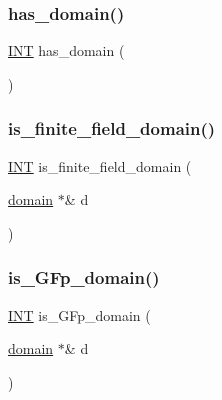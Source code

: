 \mbox{\label{domain_8_c_af7df1c554310c6214b2900bf6ca7ac81}} 
\subsubsection{\texorpdfstring{has\+\_\+domain()}{has\_domain()}}
{\footnotesize\ttfamily \mbox{\hyperlink{galois_8h_a09fddde158a3a20bd2dcadb609de11dc}{I\+NT}} has\+\_\+domain (\begin{DoxyParamCaption}{ }\end{DoxyParamCaption})}

\mbox{\label{domain_8_c_a77d0ace35941cfe84035c9a060972b2a}} 
\subsubsection{\texorpdfstring{is\+\_\+finite\+\_\+field\+\_\+domain()}{is\_finite\_field\_domain()}}
{\footnotesize\ttfamily \mbox{\hyperlink{galois_8h_a09fddde158a3a20bd2dcadb609de11dc}{I\+NT}} is\+\_\+finite\+\_\+field\+\_\+domain (\begin{DoxyParamCaption}\item[{\mbox{\hyperlink{classdomain}{domain}} $\ast$\&}]{d }\end{DoxyParamCaption})}

\mbox{\label{domain_8_c_ab75527270302df466fc6f6e355775c13}} 
\subsubsection{\texorpdfstring{is\+\_\+\+G\+Fp\+\_\+domain()}{is\_GFp\_domain()}}
{\footnotesize\ttfamily \mbox{\hyperlink{galois_8h_a09fddde158a3a20bd2dcadb609de11dc}{I\+NT}} is\+\_\+\+G\+Fp\+\_\+domain (\begin{DoxyParamCaption}\item[{\mbox{\hyperlink{classdomain}{domain}} $\ast$\&}]{d }\end{DoxyParamCaption})}

